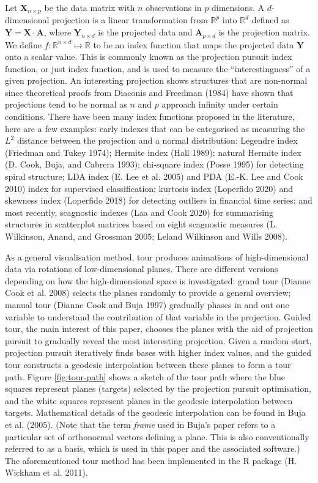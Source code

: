 Let \(\mathbf{X}_{n \times p}\) be the data matrix with \(n\) observations in \(p\) dimensions. A \(d\)-dimensional projection is a linear transformation from \(\mathbb{R}^p\) into \(\mathbb{R}^d\) defined as \(\mathbf{Y} = \mathbf{X} \cdot \mathbf{A}\), where \(\mathbf{Y}_{n \times d}\) is the projected data and \(\mathbf{A}_{p\times d}\) is the projection matrix. We define \(f: \mathbb{R}^{n \times d} \mapsto \mathbb{R}\) to be an index function that maps the projected data \(\mathbf{Y}\) onto a scalar value. This is commonly known as the projection pursuit index function, or just index function, and is used to measure the ``interestingness'' of a given projection. An interesting projection shows structures that are non-normal since theoretical proofs from Diaconis and Freedman (1984) have shown that projections tend to be normal as \(n\) and \(p\) approach infinity under certain conditions. There have been many index functions proposed in the literature, here are a few examples: early indexes that can be categorised as measuring the \(L^2\) distance between the projection and a normal distribution: Legendre index (Friedman and Tukey 1974); Hermite index (Hall 1989); natural Hermite index (D. Cook, Buja, and Cabrera 1993); chi-square index (Posse 1995) for detecting spiral structure; LDA index (E. Lee et al. 2005) and PDA (E.-K. Lee and Cook 2010) index for supervised classification; kurtosis index (Loperfido 2020) and skewness index (Loperfido 2018) for detecting outliers in financial time series; and most recently, scagnostic indexes (Laa and Cook 2020) for summarising structures in scatterplot matrices based on eight scagnostic measures (L. Wilkinson, Anand, and Grossman 2005; Leland Wilkinson and Wills 2008).

As a general visualisation method, tour produces animations of high-dimensional data via rotations of low-dimensional planes. There are different versions depending on how the high-dimensional space is investigated: grand tour (Dianne Cook et al. 2008) selects the planes randomly to provide a general overview; manual tour (Dianne Cook and Buja 1997) gradually phases in and out one variable to understand the contribution of that variable in the projection. Guided tour, the main interest of this paper, chooses the planes with the aid of projection pursuit to gradually reveal the most interesting projection. Given a random start, projection pursuit iteratively finds bases with higher index values, and the guided tour constructs a geodesic interpolation between these planes to form a tour path. Figure \ref{fig:tour-path} shows a sketch of the tour path where the blue squares represent planes (targets) selected by the projection pursuit optimisation, and the white squares represent planes in the geodesic interpolation between targets. Mathematical details of the geodesic interpolation can be found in Buja et al. (2005). (Note that the term \emph{frame} used in Buja's paper refers to a particular set of orthonormal vectors defining a plane. This is also conventionally referred to as a basis, which is used in this paper and the associated software.) The aforementioned tour method has been implemented in the R package  (H. Wickham et al. 2011).

